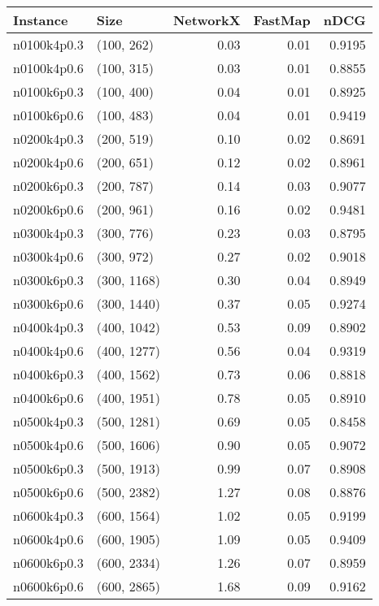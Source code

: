 \begin{tabular}{llrrr}
\toprule
   Instance &          Size &  NetworkX &  FastMap &   nDCG \\
\midrule
n0100k4p0.3 &    (100, 262) &      0.03 &     0.01 & 0.9195 \\
n0100k4p0.6 &    (100, 315) &      0.03 &     0.01 & 0.8855 \\
n0100k6p0.3 &    (100, 400) &      0.04 &     0.01 & 0.8925 \\
n0100k6p0.6 &    (100, 483) &      0.04 &     0.01 & 0.9419 \\
n0200k4p0.3 &    (200, 519) &      0.10 &     0.02 & 0.8691 \\
n0200k4p0.6 &    (200, 651) &      0.12 &     0.02 & 0.8961 \\
n0200k6p0.3 &    (200, 787) &      0.14 &     0.03 & 0.9077 \\
n0200k6p0.6 &    (200, 961) &      0.16 &     0.02 & 0.9481 \\
n0300k4p0.3 &    (300, 776) &      0.23 &     0.03 & 0.8795 \\
n0300k4p0.6 &    (300, 972) &      0.27 &     0.02 & 0.9018 \\
n0300k6p0.3 &   (300, 1168) &      0.30 &     0.04 & 0.8949 \\
n0300k6p0.6 &   (300, 1440) &      0.37 &     0.05 & 0.9274 \\
n0400k4p0.3 &   (400, 1042) &      0.53 &     0.09 & 0.8902 \\
n0400k4p0.6 &   (400, 1277) &      0.56 &     0.04 & 0.9319 \\
n0400k6p0.3 &   (400, 1562) &      0.73 &     0.06 & 0.8818 \\
n0400k6p0.6 &   (400, 1951) &      0.78 &     0.05 & 0.8910 \\
n0500k4p0.3 &   (500, 1281) &      0.69 &     0.05 & 0.8458 \\
n0500k4p0.6 &   (500, 1606) &      0.90 &     0.05 & 0.9072 \\
n0500k6p0.3 &   (500, 1913) &      0.99 &     0.07 & 0.8908 \\
n0500k6p0.6 &   (500, 2382) &      1.27 &     0.08 & 0.8876 \\
n0600k4p0.3 &   (600, 1564) &      1.02 &     0.05 & 0.9199 \\
n0600k4p0.6 &   (600, 1905) &      1.09 &     0.05 & 0.9409 \\
n0600k6p0.3 &   (600, 2334) &      1.26 &     0.07 & 0.8959 \\
n0600k6p0.6 &   (600, 2865) &      1.68 &     0.09 & 0.9162 \\

\end{tabular}
